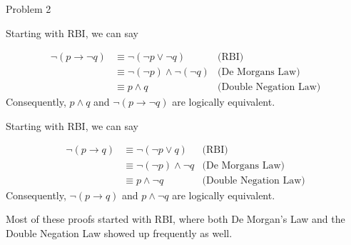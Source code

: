 \begin{problem}{Problem 2}
    \begin{highlight}
        Starting with RBI, we can say

        \begin{align*}
            \neg(p \rightarrow \neg q) & \equiv \neg(\neg p \vee \neg q) & \text{(RBI)} \\
            & \equiv \neg(\neg p) \wedge \neg(\neg q) & \text{(De Morgans Law)} \\
            & \equiv p \wedge q & \text{(Double Negation Law)}
        \end{align*}
        Consequently, $p \wedge q$ and $\neg(p \rightarrow \neg q)$ are logically equivalent.
    \end{highlight}

    \begin{highlight}
        Starting with RBI, we can say

        \begin{align*}
            \neg(p \rightarrow q) & \equiv \neg (\neg p \vee q) & \text{(RBI)} \\
            & \equiv \neg(\neg p) \wedge \neg q & \text{(De Morgans Law)} \\
            & \equiv p \wedge \neg q & \text{(Double Negation Law)}
        \end{align*}
        Consequently, $\neg(p \rightarrow q)$ and $p \wedge \neg q$ are logically equivalent.
    \end{highlight}

    \begin{highlight}[Insights]
        Most of these proofs started with RBI, where both De Morgan's Law and the Double Negation Law showed up frequently as well.
    \end{highlight}
\end{problem}

